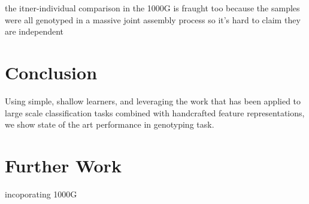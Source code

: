 \documentclass{article}
\begin{document}
the itner-individual comparison in the 1000G is fraught too
because the samples were all genotyped in a massive joint assembly process
so it's hard to claim they are independent

\section{Conclusion}

Using simple, shallow learners, and leveraging the work that has been applied to large scale classification tasks combined with handcrafted feature representations, we show state of the art performance in genotyping task.



\section{Further Work}
incoporating 1000G




\small



\end{document}
